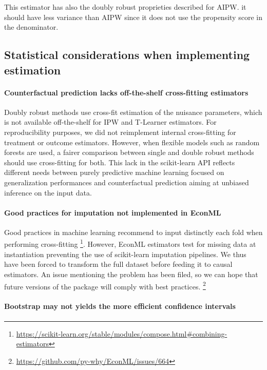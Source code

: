 \documentclass[french,12pt,twoside,a4paper]{book}
\begin{document}
\begin{appendices}
\begin{background_box_left}
    This estimator has also the doubly robust proprieties described for AIPW. it
    should have less variance than AIPW since it does not use the propensity score
    in the denominator.

  \end{background_box_left}

  \subsection{Statistical considerations when implementing
    estimation}\label{apd:statistical_considerations}

  \paragraph{Counterfactual prediction lacks off-the-shelf cross-fitting estimators}

  Doubly robust methods use cross-fit estimation of the nuisance parameters, which
  is not available off-the-shelf for IPW and T-Learner estimators. For
  reproducibility purposes, we did not reimplement internal cross-fitting for
  treatment or outcome estimators. However, when flexible models such as random
  forests are used, a fairer comparison between single and double robust methods
  should use cross-fitting for both. This lack in the scikit-learn API reflects
  different needs between purely predictive machine learning focused on
  generalization performances and counterfactual prediction aiming at unbiased
  inference on the input data.

  \paragraph{Good practices for imputation not implemented in EconML}

  Good practices in machine learning recommend to input distinctly each fold
  when performing cross-fitting
  \footnote{\url{https://scikit-learn.org/stable/modules/compose.html\#combining-estimators}}.
  However, EconML estimators test for missing data at instantiation
  preventing the use of scikit-learn imputation pipelines. We thus have been
  forced to transform the full dataset before feeding it to causal estimators.
  An issue mentioning the problem has been filed, so we can hope that future
  versions of the package will comply with best practices. \footnote{\url{https://github.com/py-why/EconML/issues/664}}

  \paragraph{Bootstrap may not yields the more efficient confidence intervals}


\end{appendices}
\end{document}
